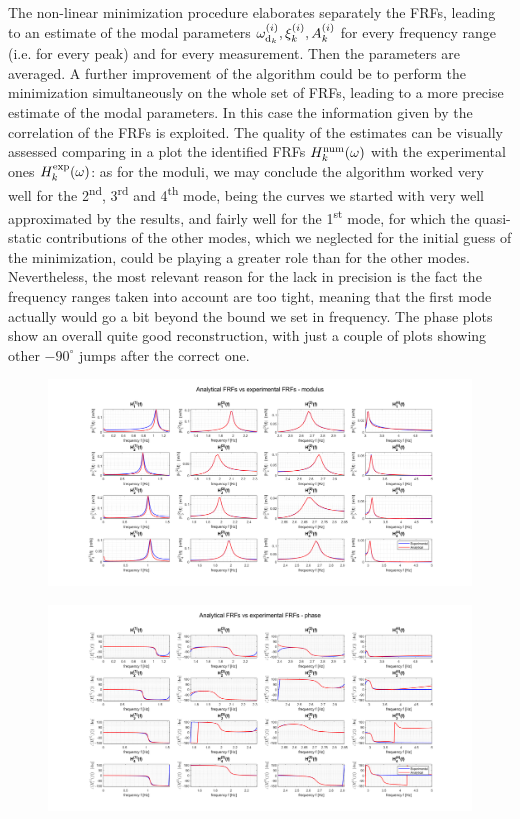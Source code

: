 \documentclass[a4paper,12pt,oneside]{article}
\begin{document}
The non-linear minimization procedure elaborates separately the FRFs, leading to an estimate of the modal parameters $ \omega_{\textup{d}_k}^{(i)}, \xi_k^{(i)}, A_k^{(i)} $ for every frequency range (i.e. for every peak) and for every measurement. Then the parameters are averaged. 
A further improvement of the algorithm could be to perform the minimization simultaneously on the whole set of FRFs, leading to a more precise estimate of the modal parameters. In this case the information given by the correlation of the FRFs is exploited. The quality of the estimates can be visually assessed comparing in a plot the identified FRFs $ H^\textup{num}_k(\omega) $ with the experimental ones $ H^\textup{exp}_k(\omega) $: as for the moduli, we may conclude the algorithm worked very well for the 2\textsuperscript{nd}, 3\textsuperscript{rd} and 4\textsuperscript{th} mode, being the curves we started with very well approximated by the results, and fairly well for the 1\textsuperscript{st} mode, for which the quasi-static contributions of the other modes, which we neglected for the initial guess of the minimization, could be playing a greater role than for the other modes. Nevertheless, the most relevant reason for the lack in precision is the fact the frequency ranges taken into account are too tight, meaning that the first mode actually would go a bit beyond the bound we set in frequency. The phase plots show an overall quite good reconstruction, with just a couple of plots showing other $ -90^\circ $ jumps after the correct one.

\begin{figure}[h]
	\hspace{-70pt}
	\includegraphics[scale=0.4]{frfs_exp_vs_num_modulus}
\end{figure}

\begin{figure}[H]
	\hspace{-70pt}
	\includegraphics[scale=0.4]{frfs_exp_vs_num_phase}
\end{figure}
\end{document}
